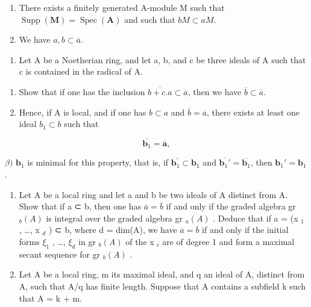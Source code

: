 \begin{enumerate}
\def\labelenumi{(\roman{enumi})}
\tightlist
\item
  There exists a finitely generated A-module M such that \(\operatorname{Supp}(\mathbf{M}) = \operatorname{Spec}(\mathbf{A})\) and such that \(bM \subset aM\).\\
\item
  We have \(a, b \subset \overline{a}\).
\end{enumerate}

\begin{enumerate}
\def\labelenumi{\arabic{enumi})}
\setcounter{enumi}{11}
\tightlist
\item
  Let A be a Noetherian ring, and let a, b, and c be three ideals of A such that c is contained in the radical of A.
\end{enumerate}

\begin{enumerate}
\def\labelenumi{\alph{enumi})}
\item
  Show that if one has the inclusion \(\overline{b + c.a} \subset \overline{a}\), then we have \(\overline{b} \subset \overline{a}\).
\item
  Hence, if A is local, and if one has \(b \subset a\) and \(\overline{b} = \overline{a}\), there exists at least one ideal \(b_{1} \subset b\) such that
\end{enumerate}

\[
\overline {{{\mathbf {b} _ {1}}}} = \overline {{{\mathbf {a}}}},
\]

\(\beta)\) \(\mathbf{b}_{1}\) is minimal for this property, that is, if \(\mathbf{b}_{1}^{\prime}\subset \mathbf{b}_{1}\) and \(\overline{\mathbf{b}_1'} = \overline{\mathbf{b}_1}\), then \(\mathbf{b}_1' = \mathbf{b}_1\).

\begin{enumerate}
\def\labelenumi{\arabic{enumi})}
\setcounter{enumi}{12}
\item
  Let A be a local ring and let a and b be two ideals of A distinct from A. Show that if a ⊂ b, then one has \(\overline{a} = \overline{b}\) if and only if the graded algebra gr \(_b(A)\) is integral over the graded algebra gr \(_a(A)\) . Deduce that if a = (x \(_1\) , \ldots, x \(_d\) ) ⊂ b, where d = dim(A), we have \(\overline{a} = \overline{b}\) if and only if the initial forms \(\xi_{1}\) , \ldots, \(\xi_{d}\) in gr \(_b(A)\) of the x \(_i\) are of degree 1 and form a maximal secant sequence for gr \(_b(A)\) .
\item
  Let A be a local ring, m its maximal ideal, and q an ideal of A, distinct from A, such that A/q has finite length. Suppose that A contains a subfield k such that A = k + m.
\end{enumerate}

